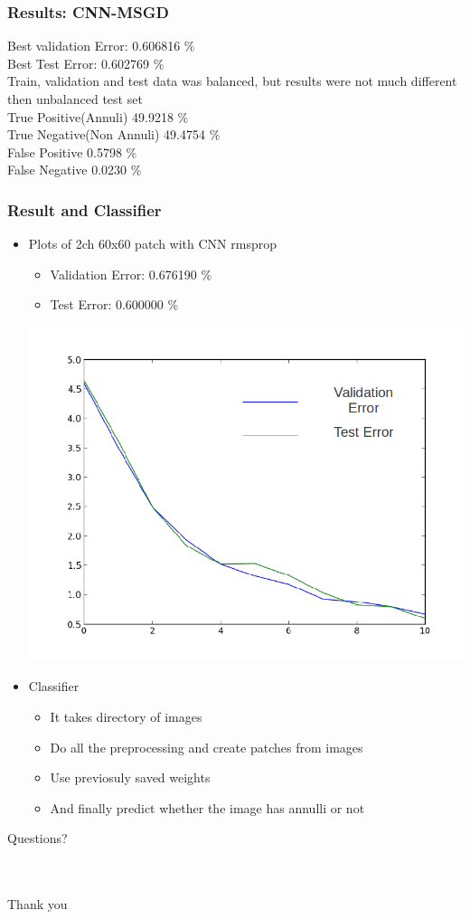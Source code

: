 \documentclass[14pt,mathserif]{beamer}
\begin{document}
\frame
{
  \frametitle{Results: CNN-MSGD}
	Best validation Error: 0.606816 \% \\
	Best Test Error: 0.602769 \% \\
	Train, validation and test data was balanced, but results were not much different then unbalanced test set \\
	True Positive(Annuli) 49.9218 \% \\ 
	True Negative(Non Annuli) 49.4754 \% \\
	False Positive 0.5798 \% \\
	False Negative 0.0230 \% \\
}


\frame
{
  \frametitle{Result and Classifier}
 \begin{itemize}
     \setlength{\itemsep}{1em}
     \item Plots of 2ch 60x60 patch with CNN rmsprop
     \begin{itemize}
     	\item Validation Error: 0.676190 \%
		\item Test Error: 0.600000 \%
     \end{itemize}
     \includegraphics[scale=0.15]{error_testCNN_rmsprop.png}  
   \end{itemize}
   \begin{itemize}
     \setlength{\itemsep}{1em}
     \item Classifier
     \begin{itemize}
     	\item It takes directory of images
     	\item Do all the preprocessing and create patches from images
     	\item Use previosuly saved weights
     	\item And finally predict whether the image has annulli or not
     \end{itemize}
  	\end{itemize}
}


\frame
{
\begin{center}
\Huge Questions?\\\ \\\ \\
\normalsize

\end{center}
}

\frame
{
\begin{center}
 \Huge Thank you
\end{center}
}
\end{document}
